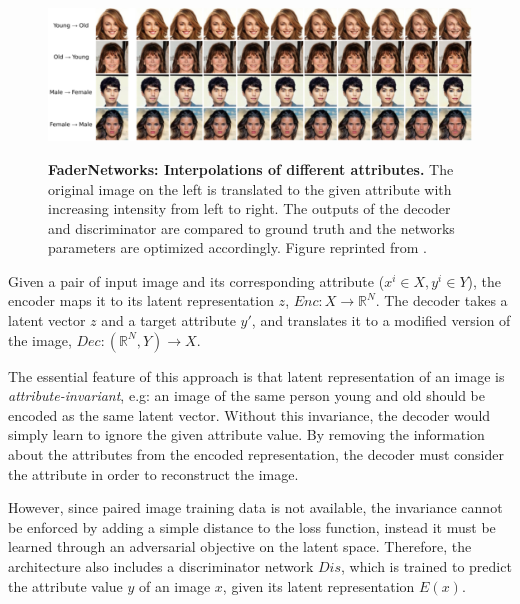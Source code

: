 \documentclass[12pt]{report}
\begin{document}
\begin{figure}[h]
\centering
{\includegraphics[width=\linewidth]{03_analysis/gans/fader_example}}
\caption{\label{fig:fader_ex} \textbf{FaderNetworks: Interpolations of different attributes.} The original image on the left is translated to the given attribute with increasing intensity from left to right. The outputs of the decoder and discriminator are compared to ground truth and the networks parameters are optimized accordingly. Figure reprinted from \cite{lample_fader_2017}.}
\end{figure}


Given a pair of input image and its corresponding attribute ($x^i \in X, y^i \in Y$), the encoder maps it to its latent representation $z$, $Enc: X \rightarrow \mathbb{R}^N$. The decoder takes a latent vector $z$ and a target attribute $y'$, and translates it to a modified version of the image, $Dec: (\mathbb{R}^N, Y) \rightarrow X$.

The essential feature of this approach is that latent representation of an image is \textit{attribute-invariant}, e.g: an image of the same person young and old should be encoded as the same latent vector. Without this invariance, the decoder would simply learn to ignore the given attribute value. By removing the information about the attributes from the encoded representation, the decoder must consider the attribute in order to reconstruct the image.

However, since paired image training data is not available, the invariance cannot be enforced by adding a simple distance to the loss function, instead it must be learned through an adversarial objective on the latent space. Therefore, the architecture also includes a discriminator network $Dis$, which is trained to predict the attribute value $y$ of an image $x$, given its latent representation $E(x)$.
\end{document}

